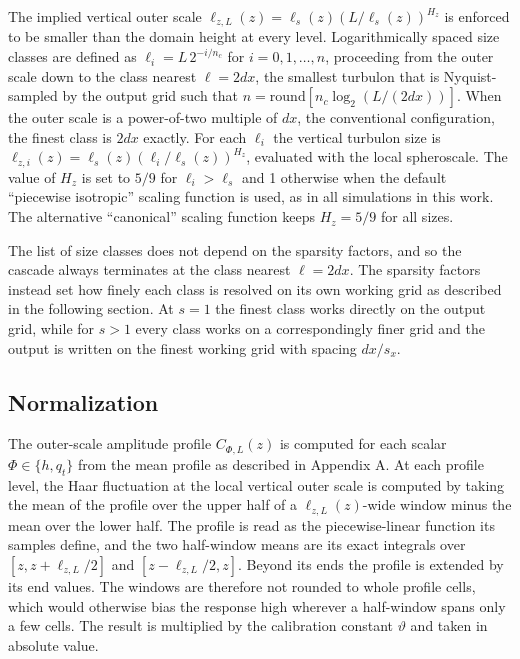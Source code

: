 \documentclass{article}
\begin{document}
The implied vertical outer scale $\ell_{z,L}(z) = \ell_s(z)\left(L/\ell_s(z)\right)^{H_z}$ is enforced to be smaller than the domain height at every level.
Logarithmically spaced size classes are defined as $\ell_i = L\, 2^{-i/n_c}$
for $i = 0, 1, \dots, n$, proceeding from the outer scale down to the
class nearest $\ell = 2dx$, the smallest turbulon that is Nyquist-sampled
by the output grid such that $n = \mathrm{round}[n_c\log_2(L/(2dx))]$. When the
outer scale is a power-of-two multiple of $dx$, the conventional
configuration, the finest class is $2dx$ exactly. For each $\ell_i$ the vertical turbulon size is $\ell_{z,i}(z) =
\ell_s(z)(\ell_i / \ell_s(z))^{H_z}$, evaluated with the local spheroscale. The value of $H_z$ is set to $5/9$ for $\ell_i>\ell_s$ and 1 otherwise when the default ``piecewise isotropic'' scaling function is used, as in all simulations in this work. The alternative ``canonical'' scaling function keeps $H_z=5/9$ for all sizes.

The list of size classes does not depend on the
sparsity factors, and so the cascade always terminates at the class nearest
$\ell = 2dx$. The sparsity factors
instead set how finely each class is resolved on its own working grid
as described in the following section. At $s = 1$ the finest class works directly on the
output grid, while for $s > 1$ every class works on a
correspondingly finer grid and the output is written on the finest
working grid with spacing $dx/s_x$.

\subsection{Normalization}\label{ssect:normalization}

The outer-scale amplitude profile $C_{\Phi, L}(z)$ is computed for each
scalar $\Phi \in \{h, q_t\}$ from the mean profile as described in
Appendix A. At each profile level, the Haar fluctuation at the local
vertical outer scale is computed by taking the mean of the profile over the upper half of
a $\ell_{z,L}(z)$-wide window minus the mean over the lower half. The
profile is read as the piecewise-linear function its samples define,
and the two half-window means are its exact integrals over
$[z, z + \ell_{z,L}/2]$ and $[z - \ell_{z,L}/2, z]$. Beyond its ends the
profile is extended by its end values. The windows are therefore not
rounded to whole profile cells, which would otherwise bias the
response high wherever a half-window spans only a few cells. The result is multiplied by the calibration
constant $\vartheta$ and taken in absolute value.
\end{document}
